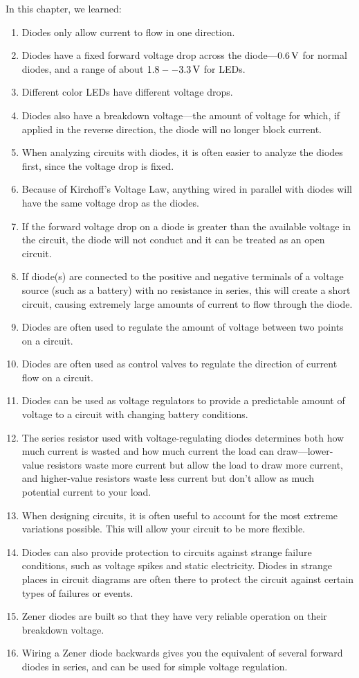 \reviewsection

In this chapter, we learned:

\begin{enumerate}
\item Diodes only allow current to flow in one direction.
\item Diodes have a fixed forward voltage drop across the diode---$0.6\,\si{\volt}$ for normal diodes, and a range of about $1.8--3.3\,\si{\volt}$ for LEDs.
\item Different color LEDs have different voltage drops.
\item Diodes also have a breakdown voltage---the amount of voltage for which, if applied in the reverse direction, the diode will no longer block current.
\item When analyzing circuits with diodes, it is often easier to analyze the diodes first, since the voltage drop is fixed.  
\item Because of Kirchoff's Voltage Law, anything wired in parallel with diodes will have the same voltage drop as the diodes.
\item If the forward voltage drop on a diode is greater than the available voltage in the circuit, the diode will not conduct and it can be treated as an open circuit.
\item If diode(s) are connected to the positive and negative terminals of a voltage source (such as a battery) with no resistance in series, this will create a short circuit, causing extremely large amounts of current to flow through the diode.
\item Diodes are often used to regulate the amount of voltage between two points on a circuit.
\item Diodes are often used as control valves to regulate the direction of current flow on a circuit.
\item Diodes can be used as voltage regulators to provide a predictable amount of voltage to a circuit with changing battery conditions.
\item The series resistor used with voltage-regulating diodes determines both how much current is wasted and how much current the load can draw---lower-value resistors waste more current but allow the load to draw more current, and higher-value resistors waste less current but don't allow as much potential current to your load.
\item When designing circuits, it is often useful to account for the most extreme variations possible.  This will allow your circuit to be more flexible.
\item Diodes can also provide protection to circuits against strange failure conditions, such as voltage spikes and static electricity.  Diodes in strange places in circuit diagrams are often there to protect the circuit against certain types of failures or events.
\item Zener diodes are built so that they have very reliable operation on their breakdown voltage.  
\item Wiring a Zener diode backwards gives you the equivalent of several forward diodes in series, and can be used for simple voltage regulation.
\end{enumerate}

\applysection

\begin{enumerate}
\end{enumerate}

